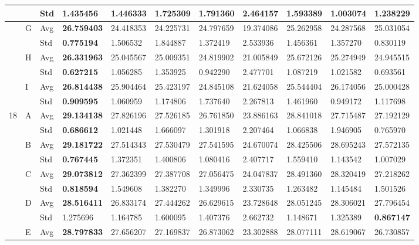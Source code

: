 \documentclass{article} %
\begin{document}
\begin{tabular}{|p{0.4in}|p{0.3in}|p{0.3in}|p{0.5in}|p{0.5in}|p{0.5in}|p{0.5in}|p{0.5in}|p{0.5in}|p{0.5in}|p{0.5in}|}
 &  & Std & 1.435456  & 1.446333  & 1.725309  & 1.791360  & 2.464157  & 1.593389  & \textbf{1.003074 } & 1.238229  \\ \hline 
 & G & Avg & \textbf{26.759403 } & 24.418353  & 24.225731  & 24.797659  & 19.374086  & 25.262958  & 24.287568  & 25.031054  \\ \hline 
 &  & Std & \textbf{0.775194 } & 1.506532  & 1.844887  & 1.372419  & 2.533936  & 1.456361  & 1.357270  & 0.830119  \\ \hline 
 & H & Avg & \textbf{26.331963 } & 25.045567  & 25.009351  & 24.819902  & 21.005849  & 25.672126  & 25.274949  & 24.945515  \\ \hline 
 &  & Std & \textbf{0.627215 } & 1.056285  & 1.353925  & 0.942290  & 2.477701  & 1.087219  & 1.021582  & 0.693561  \\ \hline 
 & I & Avg & \textbf{26.814438 } & 25.904464  & 25.423197  & 24.845108  & 21.624058  & 25.544404  & 26.174056  & 25.000428  \\ \hline 
 &  & Std & \textbf{0.909595 } & 1.060959  & 1.174806  & 1.737640  & 2.267813  & 1.461960  & 0.949172  & 1.117698  \\ \hline 
18 & A & Avg & \textbf{29.134138 } & 27.826196  & 27.526185  & 26.761850  & 23.886163  & 28.841018  & 27.715487  & 27.192129  \\ \hline 
 &  & Std & \textbf{0.686612 } & 1.021448  & 1.666097  & 1.301918  & 2.207464  & 1.066838  & 1.946905  & 0.765970  \\ \hline 
 & B & Avg & \textbf{29.181722 } & 27.514343  & 27.530479  & 27.541595  & 24.670074  & 28.425506  & 28.695243  & 27.572135  \\ \hline 
 &  & Std & \textbf{0.767445 } & 1.372351  & 1.400806  & 1.080416  & 2.407717  & 1.559410  & 1.143542  & 1.007029  \\ \hline 
 & C & Avg & \textbf{29.073812 } & 27.362399  & 27.387708  & 27.056475  & 24.047837  & 28.491360  & 28.320419  & 27.218262  \\ \hline 
 &  & Std & \textbf{0.818594 } & 1.549608  & 1.382270  & 1.349996  & 2.330735  & 1.263482  & 1.145484  & 1.501526  \\ \hline 
 & D & Avg & \textbf{28.516411 } & 26.833174  & 27.444262  & 26.629615  & 23.728648  & 28.051245  & 28.306021  & 27.796454  \\ \hline 
 &  & Std & 1.275696  & 1.164785  & 1.600095  & 1.407376  & 2.662732  & 1.148671  & 1.325389  & \textbf{0.867147 } \\ \hline 
 & E & Avg & \textbf{28.797833 } & 27.656207  & 27.169837  & 26.873062  & 23.302888  & 28.077111  & 28.619067  & 26.730857  \\ \hline 

\end{tabular}
\end{document}
